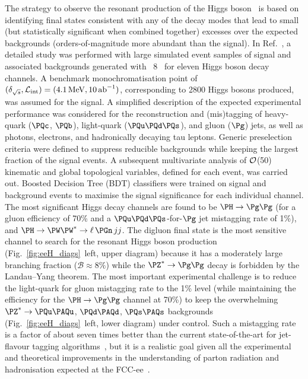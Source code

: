 The strategy to observe the resonant production of the Higgs boson~\cite{dEnterria:2021xij} 
is based on identifying final states consistent with any of the \PH decay modes 
that lead to small (but statistically significant when combined together) excesses over the expected backgrounds  
(orders-of-magnitude more abundant than the signal). 
In Ref.~\cite{dEnterria:2021xij}, a detailed study was performed with large simulated event samples of signal 
and associated backgrounds generated with \pythia~8~\cite{pythia8} for eleven Higgs boson decay channels. 
A benchmark monochromatisation point of $(\delta_{\sqrt{s}},\mathcal{L}_\text{int})=(4.1\,\text{MeV},10\,\text{ab}^{-1})$, 
corresponding to 2800 Higgs bosons produced, was assumed for the signal. 
A simplified description of the expected experimental performance was considered for the reconstruction and (mis)tagging 
of heavy-quark ($\PQc$, $\PQb$), light-quark ($\PQu\PQd\PQs$), and gluon ($\Pg$) jets, as well as photons, electrons, and hadronically decaying tau leptons. 
Generic preselection criteria were defined to suppress reducible backgrounds while keeping the largest fraction of the signal events. 
A subsequent multivariate analysis of $\cal{O}$(50) kinematic and global topological variables, defined for each event, was carried out. 
Boosted Decision Tree (BDT) classifiers were trained on signal and background events to maximise the signal significance for each individual channel. 
The most significant Higgs decay channels are found to be $\PH \to \Pg\Pg$ 
(for a gluon efficiency of 70\% and a $\PQu\PQd\PQs$-for-$\Pg$ jet mistagging rate of 1\%), 
and $\PH\to\PW\PW^* \to \ell\,\PGn\,jj$. 
The digluon final state is the most sensitive channel to search for the resonant Higgs boson production (Fig.~\ref{fig:eeH_diags}~left, upper diagram) because it has a moderately large branching fraction ($\mathcal{B}\approx 8\%$) 
while the $\PZ^*\to\Pg\Pg$ decay is forbidden by the Landau--Yang theorem. 
The most important experimental challenge is to reduce the light-quark for gluon mistagging rate to the 1\% level 
(while maintaining the efficiency for the $\PH\to\Pg\Pg$ channel at 70\%) 
to keep the overwhelming $\PZ^*\to \uubar$, $\ddbar$, $\ssbar$ backgrounds (Fig.~\ref{fig:eeH_diags}~left, lower diagram) under control. 
Such a mistagging rate is a factor of about seven times better than the current state-of-the-art for jet-flavour tagging algorithms~\cite{Bedeschi:2022rnj}, 
but it is a realistic goal given all the experimental and theoretical improvements in the understanding of parton radiation and hadronisation expected at the FCC-ee~\cite{Proceedings:2017ocd}.

